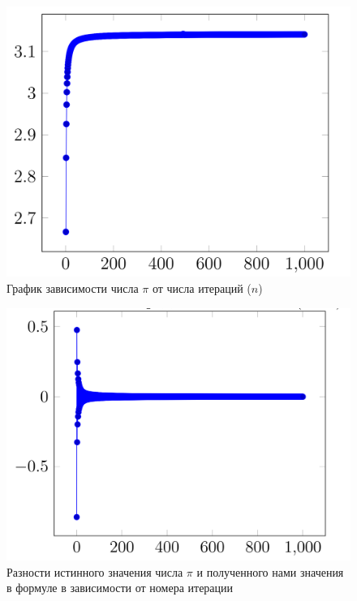 \documentclass[a4paper, 12pt]{article}
\begin{document}
\begin{enumerate}
\begin{enumerate}
                        \begin{figure}[h!]
    			        \centering
    			            \includegraphics[scale = 0.25]{1-1.png}
    			            \caption{График зависимости числа $\pi$ от числа итераций ($n$)}
    			            \label{fig:my_label}
    		          \end{figure}
                        \bigskip
                        \begin{figure}[h!]
    			        \centering
    			            \includegraphics[scale = 0.3]{1-2.png}
    			            \caption{Разности истинного значения числа $\pi$ и полученного нами значения в формуле в зависимости от номера итерации}
    			            \label{fig:my_label}
    		          \end{figure}
                

\end{enumerate}
\end{enumerate}
\end{document}
